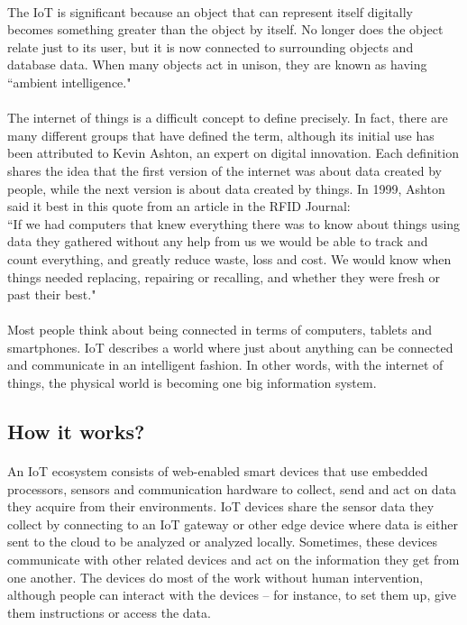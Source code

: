 \paragraph{}The IoT is significant because an object that can represent itself digitally becomes something greater than the object by itself. No longer does the object relate just to its user, but it is now connected to surrounding objects and database data. When many objects act in unison, they are known as having ``ambient intelligence."
\paragraph{}The internet of things is a difficult concept to define precisely. In fact, there are many different groups that have defined the term, although its initial use has been attributed to Kevin Ashton, an expert on digital innovation. Each definition shares the idea that the first version of the internet was about data created by people, while the next version is about data created by things. In 1999, Ashton said it best in this quote from an article in the RFID Journal:\\
``If we had computers that knew everything there was to know about things using data they gathered without any help from us  we would be able to track and count everything, and greatly reduce waste, loss and cost. We would know when things needed replacing, repairing or recalling, and whether they were fresh or past their best."
\paragraph{}Most people think about being connected in terms of computers, tablets and smartphones. IoT describes a world where just about anything can be connected and communicate in an intelligent fashion. In other words, with the internet of things, the physical world is becoming one big information system.
\subsection{How it works?} 
\paragraph{}An IoT ecosystem consists of web-enabled smart devices that use embedded processors, sensors and communication hardware to collect, send and act on data they acquire from their environments. IoT devices share the sensor data they collect by connecting to an IoT gateway or other edge device where data is either sent to the cloud to be analyzed or analyzed locally. Sometimes, these devices communicate with other related devices and act on the information they get from one another. The devices do most of the work without human intervention, although people can interact with the devices -- for instance, to set them up, give them instructions or access the data.
